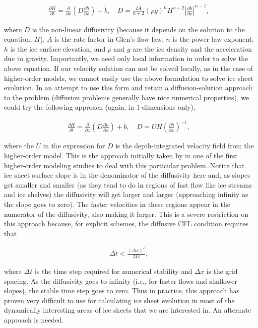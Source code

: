 \begin{align*}
\frac{\partial H}{\partial t}=\frac{\partial }{\partial x}\left( D\frac{\partial h}{\partial x} \right)+\dot{b},\quad D=\frac{2A}{n+2}\left( \rho g \right)^{n}H^{n+2}\left| \frac{\partial h}{\partial x} \right|^{n-1},
\end{align*}

where $D$ is the non-linear diffusivity (because it depends on the solution to the equation, $H$), $A$ is the rate factor in Glen's flow law, $n$ is the power-law exponent, $h$ is the ice surface elevation, and $\rho$ and $g$ are the ice density and the acceleration due to gravity. Importantly, we need only local information in order to solve the above equation. If our velocity solution can not be solved locally, as in the case of higher-order models, we cannot easily use the above formulation to solve ice sheet evolution. In an attempt to use this form and retain a diffusion-solution approach to the problem (diffusion problems generally have nice numerical properties), we could try the following approach (again, in 1-dimensions only),

\begin{align*}
\frac{\partial H}{\partial t}=\frac{\partial }{\partial x}\left( D\frac{\partial h}{\partial x} \right)+\dot{b},\quad D=UH\left( \frac{\partial h}{\partial x} \right)^{-1},
\end{align*}

where the $U$ in the expression for $D$ is the depth-integrated velocity field from the higher-order model. This is the approach initially taken by \citet{Pattyn:2003tj} in one of the first higher-order modeling studies to deal with this particular problem. Notice that ice sheet surface slope is in the denominator of the diffusivity here and, as slopes get smaller and smaller (as they tend to do in regions of fast flow like ice streams and ice shelves) the diffusivity will get larger and larger (approaching infinity as the slope goes to zero). The faster velocities in these regions appear in the numerator of the diffusivity, also making it larger. This is a severe restriction on this approach because, for explicit schemes, the diffusive CFL condition requires that

\begin{align*}
\Delta t<\frac{\left( \Delta x \right)^{2}}{2D},
\end{align*}

where $\Delta t$ is the time step required for numerical stability and $\Delta x$ is the grid spacing. As the diffusivity goes to infinity (i.e., for faster flows and shallower slopes), the stable time step goes to zero. Thus in practice, this approach has proven very difficult to use for calculating ice sheet evolution in most of the dynamically interesting areas of ice sheets that we are interested in. An alternate approach is needed.


